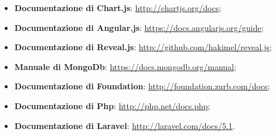 \begin{itemize}
\begin{itemize}
\begin{itemize}
\begin{itemize}
						\end{itemize}
					\end{itemize}
					\item \textbf{Documentazione di Chart.js}: \url{http://chartjs.org/docs};
					\item \textbf{Documentazione di Angular.js}: \url{https://docs.angularjs.org/guide};
					\item \textbf{Documentazione di Reveal.js}: \url{http://github.com/hakimel/reveal.js};
					\item \textbf{Manuale di MongoDb}: \url{https://docs.mongodb.org/manual};
					\item \textbf{Documentazione di Foundation}: \url{http://foundation.zurb.com/docs};
 					\item \textbf{Documentazione di Php}: \url{http://php.net/docs.php};
 					\item \textbf{Documentazione di Laravel}: \url{http://laravel.com/docs/5.1}.
				\end{itemize}

	\end{itemize}